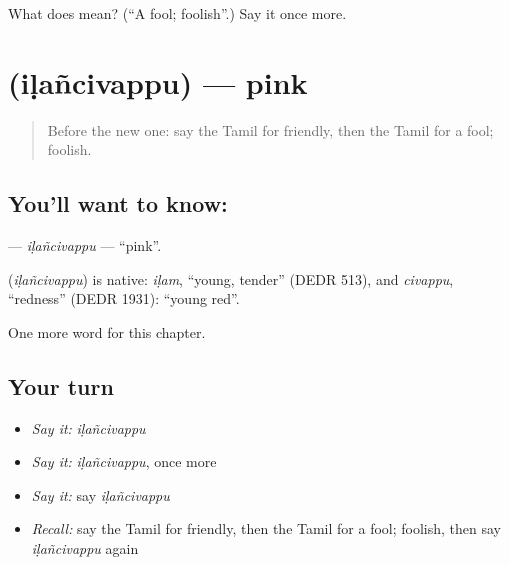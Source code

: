 \begin{tcolorbox}[breakable,colback=teal!4,colframe=teal!35!black,title={Before you move on}]
What does  mean? (\textquotedblleft{}A fool; foolish\textquotedblright{}.) Say it once more.
\end{tcolorbox}
\section[\texorpdfstring{\ta{இளஞ்சிவப்பு} (iḷañcivappu)}{இளஞ்சிவப்பு (iḷañcivappu)}]{ (iḷañcivappu) — pink}

\label{lesson:TA-C211-ilancivappu}



\begin{quote}
Before the new one: say the Tamil for friendly, then the Tamil for a fool; foolish.
\end{quote}

\subsection*{You'll want to know: }
\textbf{} — \emph{iḷañcivappu} — \textquotedblleft{}pink\textquotedblright{}.

\begin{cousinweb}
\textbf{} (\emph{iḷañcivappu}) is native: \emph{iḷam}, \textquotedblleft{}young, tender\textquotedblright{} (DEDR 513), and \emph{civappu}, \textquotedblleft{}redness\textquotedblright{} (DEDR 1931): \textquotedblleft{}young red\textquotedblright{}.
\end{cousinweb}

\begin{grammarlens}[title={What you've built}]
One more word for this chapter.
\end{grammarlens}

\subsection*{Your turn}
\begin{itemize}
\raggedright
  \item \emph{Say it:} \emph{iḷañcivappu}
  \item \emph{Say it:} \emph{iḷañcivappu}, once more
  \item \emph{Say it:} say \emph{iḷañcivappu}
  \item \emph{Recall:} say the Tamil for friendly, then the Tamil for a fool; foolish, then say \emph{iḷañcivappu} again
\end{itemize}

